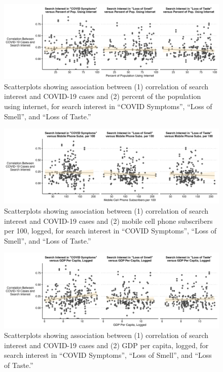 \documentclass{article}
\begin{document}
\begin{figure}[H]
    \includegraphics[width=1\textwidth]{figures/cor_internet_scatter.png}
    \caption{Scatterplots showing association between (1) correlation of search interest and COVID-19 cases and (2) percent of the population using internet, for search interest in ``COVID Symptoms'', ``Loss of Smell'', and ``Loss of Taste.''}
    \label{fig:cor_internet_scatter}
\end{figure}

\begin{figure}[H]
    \includegraphics[width=1\textwidth]{figures/cor_mobilecell_scatter.png}
    \caption{Scatterplots showing association between (1) correlation of search interest and COVID-19 cases and (2) mobile cell phone subscribers per 100, logged, for search interest in ``COVID Symptoms'', ``Loss of Smell'', and ``Loss of Taste.''}
    \label{fig:cor_mobilecell_scatter}
\end{figure}

\begin{figure}[H]
    \includegraphics[width=1\textwidth]{figures/cor_gdp_scatter.png}
    \caption{Scatterplots showing association between (1) correlation of search interest and COVID-19 cases and (2) GDP per capita, logged, for search interest in ``COVID Symptoms'', ``Loss of Smell'', and ``Loss of Taste.''}
    \label{fig:cor_gdp_scatter}
\end{figure}
\end{document}
